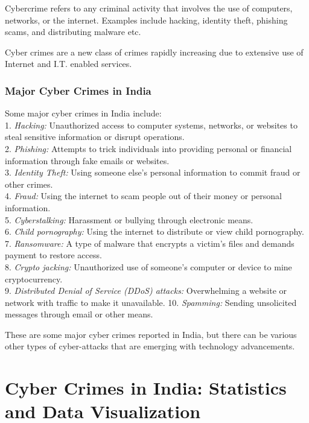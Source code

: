 \documentclass[
  12,
  a4paper,
]{report}
\begin{document}
Cybercrime refers to any criminal activity that involves the use of
computers, networks, or the internet. Examples include hacking, identity
theft, phishing scams, and distributing malware etc.

Cyber crimes are a new class of crimes rapidly increasing due to
extensive use of Internet and I.T. enabled services.

\hypertarget{major-cyber-crimes-in-india}{%
\subsection{Major Cyber Crimes in
India}\label{major-cyber-crimes-in-india}}

Some major cyber crimes in India include:\\
1. \emph{Hacking:} Unauthorized access to computer systems, networks, or
websites to steal sensitive information or disrupt operations.\\
2. \emph{Phishing:} Attempts to trick individuals into providing
personal or financial information through fake emails or websites.\\
3. \emph{Identity Theft:} Using someone else's personal information to
commit fraud or other crimes.\\
4. \emph{Fraud:} Using the internet to scam people out of their money or
personal information.\\
5. \emph{Cyberstalking:} Harassment or bullying through electronic
means.\\
6. \emph{Child pornography:} Using the internet to distribute or view
child pornography.\\
7. \emph{Ransomware:} A type of malware that encrypts a victim's files
and demands payment to restore access.\\
8. \emph{Crypto jacking:} Unauthorized use of someone's computer or
device to mine cryptocurrency.\\
9. \emph{Distributed Denial of Service (DDoS) attacks:} Overwhelming a
website or network with traffic to make it unavailable. 10.
\emph{Spamming:} Sending unsolicited messages through email or other
means.

These are some major cyber crimes reported in India, but there can be
various other types of cyber-attacks that are emerging with technology
advancements.

\hypertarget{cyber-crimes-in-india-statistics-and-data-visualization}{%
\chapter{Cyber Crimes in India: Statistics and Data
Visualization}\label{cyber-crimes-in-india-statistics-and-data-visualization}}
\end{document}
